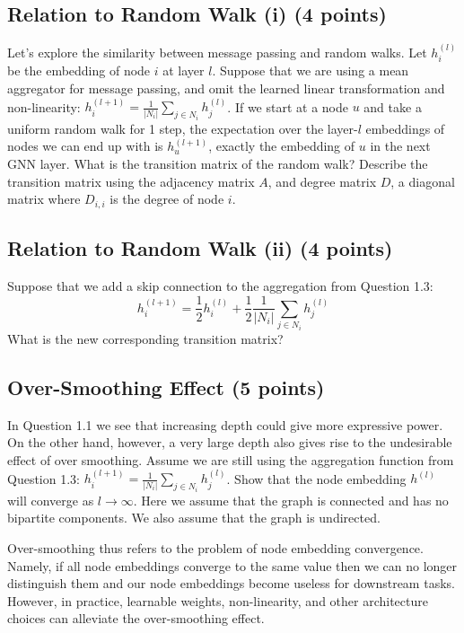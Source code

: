 \subsection{Relation to Random Walk (i) (4 points)}

Let’s explore the similarity between message passing and random walks. Let $h^{(l)}_i$ be the embedding of node $i$ at layer $l$. Suppose that we are using a mean aggregator for message passing, and omit the learned linear transformation and non-linearity: $h^{(l+1)}_i = \frac{1}{|N_i|} \sum_{j \in N_i} h^{(l)}_j$. If we start at a node $u$ and take a uniform random walk for 1 step, the expectation over the layer-$l$ embeddings
of nodes we can end up with is $h^{(l+1)}_u$, exactly the embedding of $u$ in the next GNN layer. What is the transition matrix of the random walk? Describe the transition matrix using the adjacency matrix $A$, and degree matrix $D$, a diagonal matrix where $D_{i,i}$ is the degree of node $i$.


\subsection{Relation to Random Walk (ii) (4 points)}

Suppose that we add a skip connection to the aggregation from Question 1.3:
$$h^{(l+1)}_i = \frac{1}{2}h^{(l)}_i + \frac{1}{2}\frac{1}{|N_i|} \sum_{j \in N_i} h^{(l)}_j$$
What is the new corresponding transition matrix?


\subsection{Over-Smoothing Effect (5 points)}

In Question 1.1 we see that increasing depth could give more expressive power.
On the other hand, however, a very large depth also gives rise to the undesirable
effect of over smoothing. Assume we are still using the aggregation function
from Question 1.3: $h^{(l+1)}_i = \frac{1}{|N_i|} \sum_{j \in N_i} h^{(l)}_j$. Show that the node embedding $h^{(l)}$ will converge as $l \rightarrow \infty$. Here we assume that the graph is connected and has no bipartite components. We also assume that the graph is undirected.

Over-smoothing thus refers to the problem of node embedding convergence. Namely, if all node embeddings converge to the same value then we can no longer distinguish them and our node embeddings become useless for downstream tasks. However, in practice, learnable weights, non-linearity, and other architecture choices can alleviate the over-smoothing effect.

